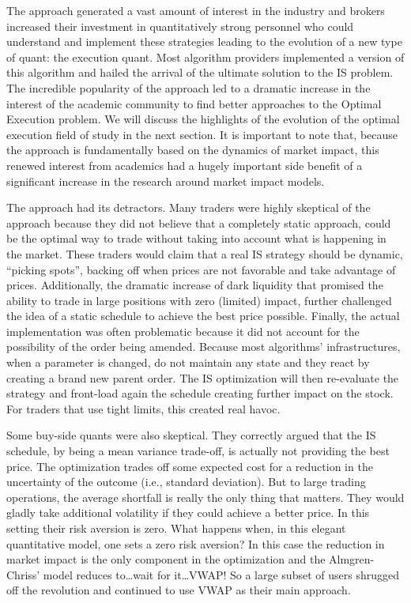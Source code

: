 The approach generated a vast amount of interest in the industry and brokers increased their investment in quantitatively strong personnel who could understand and implement these strategies leading to the evolution of a new type of quant: the execution quant. Most algorithm providers implemented a version of this algorithm and hailed the arrival of the ultimate solution to the IS problem. The incredible popularity of the approach led to a dramatic increase in the interest of the academic community to find better approaches to the Optimal Execution problem. We will discuss the highlights of the evolution of the optimal execution field of study in the next section. It is important to note that, because the approach is fundamentally based on the dynamics of market impact, this renewed interest from academics had  a hugely important side benefit of a significant increase in the research around market impact models. 


The approach had its detractors. Many traders were highly skeptical of the approach because they did not believe that a completely static approach, could be the optimal way to trade without taking into account what is happening in the market. These traders would claim that a real IS strategy should be dynamic, ``picking spots'', backing off when prices are not favorable and take advantage of prices.  Additionally, the dramatic increase of dark liquidity that promised the ability to trade in large positions with zero (limited) impact, further challenged the idea of a static schedule to achieve the best price possible. Finally, the actual implementation was often problematic because it did not account for the possibility of the order being amended. Because most algorithms' infrastructures, when a parameter is changed, do not maintain any state and they react by creating a brand new parent order. The IS optimization will then re-evaluate the strategy and front-load again the schedule creating further impact on the stock. For traders that use tight limits, this created real havoc.


Some buy-side quants were also skeptical. They correctly argued that the IS schedule, by being a mean variance trade-off, is actually not providing the best price. The optimization trades off some expected cost for a reduction in the uncertainty of the outcome (i.e., standard deviation). But to large trading operations, the average shortfall is really the only thing that matters. They would gladly take additional volatility if they could achieve a better price. In this setting their risk aversion is zero. What happens when, in this elegant quantitative model, one sets a zero risk aversion? In this case the reduction in market impact is the only component in the optimization and the Almgren-Chriss' model reduces to\dots  wait for it\dots VWAP! So a large subset of users shrugged off the revolution and continued to use VWAP as their main approach.


